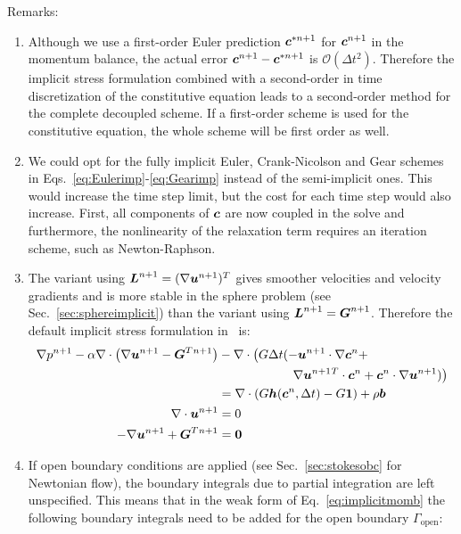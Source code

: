 Remarks:
\begin{enumerate}
   \item Although we use a first-order Euler prediction $\boldsymbol{c}^{*n+1}$ for
$\boldsymbol{c}^{n+1}$ in
the momentum balance, the actual error $\boldsymbol{c}^{n+1}-\boldsymbol{c}^{*n+1}$ is 
    $\mathcal{O}(\Delta t^2)$. Therefore the implicit stress formulation 
combined with a second-order in time discretization of the constitutive equation
leads to a second-order method for the complete decoupled scheme. If a
first-order scheme is used for the constitutive equation, the whole scheme will
be first order as well.
   \item We could opt for the fully implicit Euler, Crank-Nicolson and Gear
schemes in Eqs.~\eqref{eq:Eulerimp}-\eqref{eq:Gearimp} instead of the semi-implicit
ones. This would increase the time step limit, but the cost for each time step
would also increase. First, all components of $\boldsymbol{c}$ are now coupled in the
solve and furthermore, the nonlinearity of the relaxation term requires an
iteration scheme, such as Newton-Raphson.
   \item The variant using $\boldsymbol{L}^{n+1}=(\nabla\boldsymbol{u}^{n+1})^T$ gives smoother
         velocities and velocity gradients and is more stable in the sphere
         problem (see Sec.~\ref{sec:sphereimplicit}) than the variant using 
         $\boldsymbol{L}^{n+1}=\boldsymbol{G}^{n+1}$. Therefore the default implicit stress 
         formulation in \tfem\ is:
\begin{align}
      \nabla p^{n+1} 
  -\alpha\nabla\cdot\big(\nabla\boldsymbol{u}^{n+1} -\boldsymbol{G}^T{}^{n+1} \big)
  &-\nabla\cdot\big(G\Delta t(-\boldsymbol{u}^{n+1}\cdot\nabla\boldsymbol{c}^n+\notag\\
        &\qquad\qquad\qquad\nabla\boldsymbol{u}^{n+1}{}^T\cdot\boldsymbol{c}^n+
      \boldsymbol{c}^n\cdot\nabla \boldsymbol{u}^{n+1})\big)\notag\\
&=\nabla\cdot( G\boldsymbol{h}(\boldsymbol{c}^n,\Delta t) -G\boldsymbol{1})
        + \rho\boldsymbol{b}\label{eq:implicitmomb}\\
     \nabla\cdot\boldsymbol{u}^{n+1}&=0\\
   -\nabla\boldsymbol{u}^{n+1} + \boldsymbol{G}^T{}^{n+1} &= \boldsymbol{0}
\end{align}
   \item 
If open boundary conditions are applied (see Sec.~\ref{sec:stokesobc} for Newtonian flow),
the boundary integrals due to partial integration are
left unspecified. This means that
in the weak form of Eq.~\eqref{eq:implicitmomb} the following boundary
integrals need to be added for the open boundary $\Gamma_\text{open}$:
\begin{multline}

\end{multline}
\end{enumerate}
